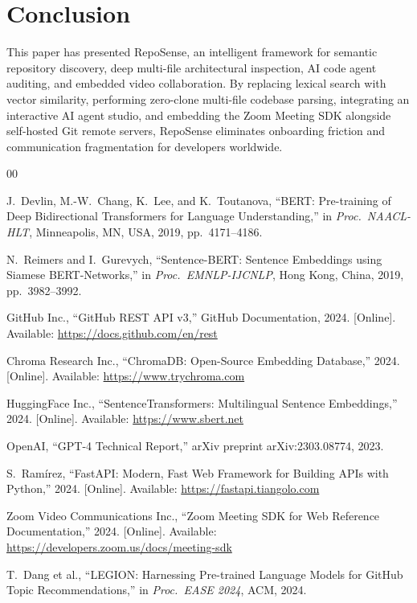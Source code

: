 \documentclass[journal]{IEEEtran}
\begin{document}
\section{Conclusion}
\label{sec:conclusion}

This paper has presented RepoSense, an intelligent framework for semantic repository discovery, deep multi-file architectural inspection, AI code agent auditing, and embedded video collaboration. By replacing lexical search with vector similarity, performing zero-clone multi-file codebase parsing, integrating an interactive AI agent studio, and embedding the Zoom Meeting SDK alongside self-hosted Git remote servers, RepoSense eliminates onboarding friction and communication fragmentation for developers worldwide.

\begin{thebibliography}{00}

J.\ Devlin, M.-W.\ Chang, K.\ Lee, and K.\ Toutanova,
``BERT: Pre-training of Deep Bidirectional Transformers for Language Understanding,''
in \textit{Proc.\ NAACL-HLT}, Minneapolis, MN, USA, 2019, pp.\ 4171--4186.

N.\ Reimers and I.\ Gurevych,
``Sentence-BERT: Sentence Embeddings using Siamese BERT-Networks,''
in \textit{Proc.\ EMNLP-IJCNLP}, Hong Kong, China, 2019, pp.\ 3982--3992.

GitHub Inc., ``GitHub REST API v3,'' GitHub Documentation, 2024.
[Online]. Available: \url{https://docs.github.com/en/rest}

Chroma Research Inc., ``ChromaDB: Open-Source Embedding Database,'' 2024.
[Online]. Available: \url{https://www.trychroma.com}

HuggingFace Inc., ``SentenceTransformers: Multilingual Sentence Embeddings,'' 2024.
[Online]. Available: \url{https://www.sbert.net}

OpenAI, ``GPT-4 Technical Report,'' arXiv preprint arXiv:2303.08774, 2023.

S.\ Ramírez, ``FastAPI: Modern, Fast Web Framework for Building APIs with Python,'' 2024.
[Online]. Available: \url{https://fastapi.tiangolo.com}

Zoom Video Communications Inc., ``Zoom Meeting SDK for Web Reference Documentation,'' 2024.
[Online]. Available: \url{https://developers.zoom.us/docs/meeting-sdk}

T.\ Dang et al.,
``LEGION: Harnessing Pre-trained Language Models for GitHub Topic Recommendations,''
in \textit{Proc.\ EASE 2024}, ACM, 2024.

\end{thebibliography}
\end{document}
